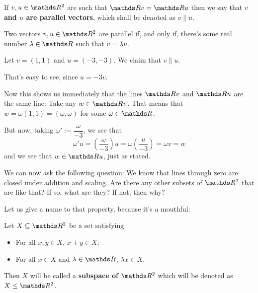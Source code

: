 \begin{df}
	If $v,u\in \R^2$ are such that $\R v=\R u$ then we say that \textbf{$v$ and $u$ are parallel vectors}, which shall be denoted as $v\parallel u$.
\end{df}
\begin{cor}
	Two vectors $v,u\in \R^2$ are parallel if, and only if, there's some real number $\lambda\in \R$ such that $v=\lambda u$.
\end{cor}

\begin{ex}
	Let $v=(1,1)$ and $u=(-3,-3)$. We claim that $v\parallel u$.
	
	That's easy to see, since $u=-3v$.
	
	Now this shows us immediately that the lines $\R v$ and $\R u$ are the same line: Take any $w\in \R v$. That means that $w=\omega(1,1)=(\omega,\omega)$ for some $\omega\in \R$.
	
	 But now, taking $\omega':=\dfrac{\omega}{-3}$, we see that 
	 \[\omega' u=\left(\frac{\omega}{-3}\right)u=\omega\left(\frac{u}{-3}\right)=\omega v=w\]and we see that $w\in \R u$, just as stated.
\end{ex}

We can now ask the following question: We know that lines through zero are closed under addition and scaling. Are there any other subsets of $\R^2$ that are like that? If so, what are they? If not, then why?

Let us give a name to that property, because it's a mouthful:

\begin{df}
	Let $X\subseteq \R^2$ be a set satisfying
	\begin{itemize}
		\item For all $x,y\in X$, $x+y\in X$;
		\item For all $x\in X$ and $\lambda\in \R$, $\lambda x\in X$.
	\end{itemize}

Then $X$ will be called a \textbf{subspace of $\R^2$} which will be denoted as $X\leq \R^2$.
\end{df}


